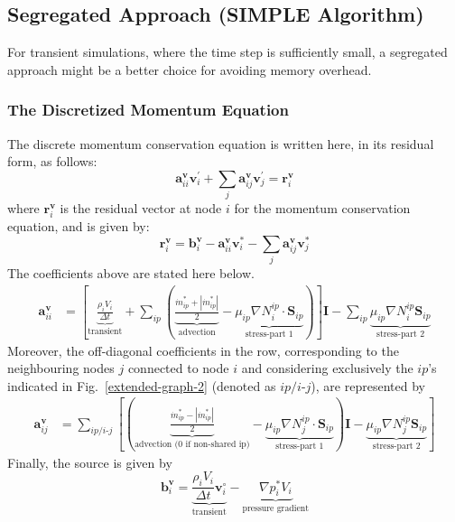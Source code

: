 \documentclass[12pt]{extarticle}
\newcommand{\<}{\langle}
\renewcommand{\>}{\rangle}
\theoremstyle{definition}
\begin{document}
\subsection{Segregated Approach (SIMPLE Algorithm)}

For transient simulations, where the time step is sufficiently small, a segregated approach might be a better choice for avoiding memory overhead.

\subsubsection{The Discretized Momentum Equation}

The discrete momentum conservation equation is written here, in its residual form, as follows:
\begin{equation}
    \textbf{a}_{ii}^{\textbf{v}} \textbf{v}_i^\prime + \sum_{j} \textbf{a}_{ij}^{\textbf{v}} \textbf{v}_j^\prime = \textbf{r}_i^{\textbf{v}}
    \label{eq:seg_mom}
\end{equation}
where $\textbf{r}_i^\textbf{v}$ is the residual vector at node $i$ for the momentum conservation equation, and is given by:
\begin{equation}
    \textbf{r}_i^{\textbf{v}} = \textbf{b}_i^{\textbf{v}} - \textbf{a}_{ii}^{\textbf{v}} \textbf{v}_i^* - \sum_{j} \textbf{a}_{ij}^{\textbf{v}} \textbf{v}_j^*
\end{equation}
The coefficients above are stated here below.
\begin{align}
    \mathbf{a}_{ii}^{\mathbf{v}} &= \left[
    \underbrace{\frac{\rho_i V_i}{\Delta t}}_{\text{transient}} 
    + \sum_{ip} \left(
    \underbrace{\frac{\dot{m}_{ip}^* + |\dot{m}_{ip}^*|}{2}}_{\text{advection}}
    - \underbrace{\mu_{ip} \nabla N_i^{ip} \cdot \mathbf{S}_{ip}}_{\text{stress-part 1}}
    \right)
    \right] \mathbf{I}  - \sum_{ip} \underbrace{\mu_{ip} \nabla N_i^{ip} \mathbf{S}_{ip}}_{\text{stress-part 2}}
    \label{eq:seg_mom_coeff1a}
\end{align}
Moreover, the off-diagonal coefficients in the row, corresponding to the neighbouring nodes $j$ connected to node $i$ and considering exclusively the $ip$'s indicated in Fig.~\ref{extended-graph-2} (denoted as $ip/i\text{-}j$), are represented by
\begin{align}
    \mathbf{a}_{ij}^{\mathbf{v}} &= \sum_{ip/i\text{-}j} \left[\left(\underbrace{\frac{\dot{m}_{ip}^* - |\dot{m}_{ip}^*|}{2}}_{\text{advection (0 if non-shared ip)}}-\underbrace{\mu_{ip} \nabla N_j^{ip} \cdot \mathbf{S}_{ip}}_{\text{stress-part 1}}
    \right) \mathbf{I}
    - \underbrace{\mu_{ip} \nabla N_j^{ip} \mathbf{S}_{ip}}_{\text{stress-part 2}} \right] \label{seg_aijvv_mom}
\end{align}
Finally, the source is given by
\begin{equation}
    \mathbf{b}_i^{\mathbf{v}} = \underbrace{\frac{\rho_i V_i}{\Delta t} \mathbf{v}^{\circ}_i}_{\text{transient}} - \underbrace{\nabla p_i^* V_i}_{\text{pressure gradient}}
    \label{eq:seg_mom_coeff3}
\end{equation}
\end{document}
